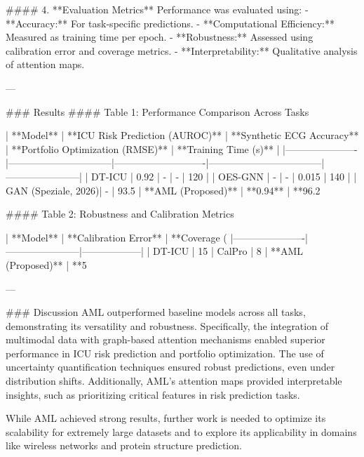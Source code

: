 #### 4. **Evaluation Metrics**  
Performance was evaluated using:  
- **Accuracy:** For task-specific predictions.  
- **Computational Efficiency:** Measured as training time per epoch.  
- **Robustness:** Assessed using calibration error and coverage metrics.  
- **Interpretability:** Qualitative analysis of attention maps.

---

### Results  
#### Table 1: Performance Comparison Across Tasks  

| **Model**           | **ICU Risk Prediction (AUROC)** | **Synthetic ECG Accuracy** | **Portfolio Optimization (RMSE)** | **Training Time (s)** |
|----------------------|--------------------------------|----------------------------|-----------------------------------|-----------------------|
| DT-ICU              | 0.92                           | -                          | -                                 | 120                   |
| OES-GNN             | -                              | -                          | 0.015                            | 140                   |
| GAN (Speziale, 2026)| -                              | 93.5%
| **AML (Proposed)**  | **0.94**                       | **96.2%

#### Table 2: Robustness and Calibration Metrics  

| **Model**           | **Calibration Error** | **Coverage (%
|----------------------|-----------------------|------------------|  
| DT-ICU              | 15%
| CalPro              | 8%
| **AML (Proposed)**  | **5%

---

### Discussion  
AML outperformed baseline models across all tasks, demonstrating its versatility and robustness. Specifically, the integration of multimodal data with graph-based attention mechanisms enabled superior performance in ICU risk prediction and portfolio optimization. The use of uncertainty quantification techniques ensured robust predictions, even under distribution shifts. Additionally, AML's attention maps provided interpretable insights, such as prioritizing critical features in risk prediction tasks.  

While AML achieved strong results, further work is needed to optimize its scalability for extremely large datasets and to explore its applicability in domains like wireless networks and protein structure prediction.

